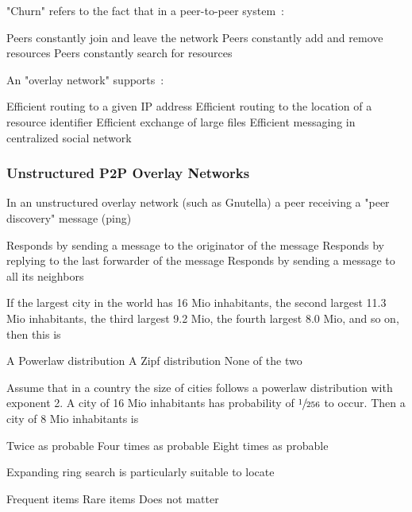 \documentclass[12pt,a4paper,answers]{exam} %
\begin{document}
\begin{flushleft}
\begin{multicols*}{2}
\begin{questions}
\question "Churn" refers to the fact that in a peer-to-peer system~:
\begin{checkboxes}
\CorrectChoice Peers constantly join and leave the network
\choice Peers constantly add and remove resources
\choice Peers constantly search for resources
\end{checkboxes}

\question An "overlay network" supports~:
\begin{checkboxes}
\choice Efficient routing to a given IP address
\CorrectChoice Efficient routing to the location of a resource identifier
\choice Efficient exchange of large files
\choice Efficient messaging in centralized social network
\end{checkboxes}


\subsubsection{Unstructured P2P Overlay Networks}

\question In an unstructured overlay network (such as Gnutella) a peer receiving a "peer discovery" message (ping)
\begin{checkboxes}
\choice Responds by sending a message to the originator of the message
\CorrectChoice Responds by replying to the last forwarder of the message
\choice Responds by sending a message to all its neighbors
\end{checkboxes}

\question If the largest city in the world has 16 Mio inhabitants, the second largest 11.3 Mio inhabitants, the third largest 9.2 Mio, the fourth largest 8.0 Mio, and so on, then this is
\begin{checkboxes}
\choice A Powerlaw distribution
\CorrectChoice A Zipf distribution
\choice None of the two
\end{checkboxes}

\question Assume that in a country the size of cities follows a powerlaw distribution with exponent 2. A city of 16 Mio inhabitants has probability of $\sfrac{1}{256}$ to occur. Then a city of 8 Mio inhabitants is
\begin{checkboxes}
\choice Twice as probable
\CorrectChoice Four times as probable
\choice Eight times as probable
\end{checkboxes}

\question Expanding ring search is particularly suitable to locate
\begin{checkboxes}
\CorrectChoice Frequent items
\choice Rare items
\choice Does not matter
\end{checkboxes}


\end{questions}
\end{multicols*}
\end{flushleft}
\end{document}
